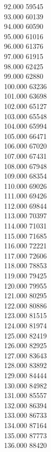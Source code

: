 { 92.000	59545 \\
 93.000	60139 \\
 94.000	60590 \\
 95.000	61016 \\
 96.000	61376 \\
 97.000	61915 \\
 98.000	62425 \\
 99.000	62880 \\
 100.000	63236 \\
 101.000	63698 \\
 102.000	65127 \\
 103.000	65548 \\
 104.000	65994 \\
 105.000	66471 \\
 106.000	67020 \\
 107.000	67431 \\
 108.000	67948 \\
 109.000	68354 \\
 110.000	69026 \\
 111.000	69426 \\
 112.000	69844 \\
 113.000	70397 \\
 114.000	71031 \\
 115.000	71685 \\
 116.000	72221 \\
 117.000	72606 \\
 118.000	78853 \\
 119.000	79425 \\
 120.000	79955 \\
 121.000	80295 \\
 122.000	80886 \\
 123.000	81515 \\
 124.000	81974 \\
 125.000	82419 \\
 126.000	82925 \\
 127.000	83643 \\
 128.000	83892 \\
 129.000	84444 \\
 130.000	84982 \\
 131.000	85557 \\
 132.000	86394 \\
 133.000	86733 \\
 134.000	87164 \\
 135.000	87773 \\
 136.000	88420 \\
}
